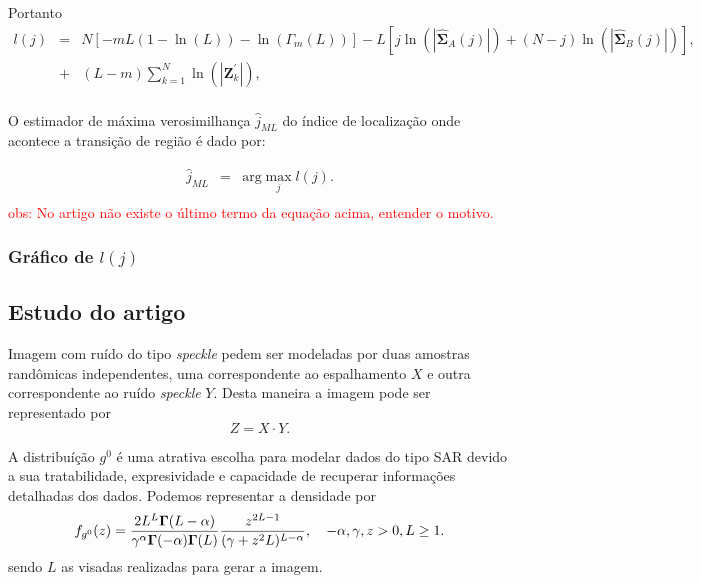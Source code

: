 Portanto 
\begin{equation}\label{eqn124}
\begin{array}{rcl}
	l(j)&=&N\left[-mL(1-\ln{\left(L\right)})-\ln{\left(\Gamma_m(L)\right)}\right]-L\left[j\ln{\left(|\mathbf{\widehat{\Sigma}}_{A}(j)|\right)} +(N-j)\ln{\left(|\mathbf{\widehat{\Sigma}}_{B}(j)|\right)}\right], \\
	&+&(L-m)\sum_{k=1}^{N}\ln{\left(|\mathbf{Z}_{k}^{'}|\right)}, \\
\end{array}
\end{equation}

O estimador de máxima verosimilhança $\widehat{j}_{ML}$ do índice de localização onde acontece a transição de região é dado por:


\begin{equation}\label{eqn125}
\begin{array}{rcl}
	\widehat{j}_{ML}&=&\text{arg}\max\limits_{j}l(j).  \\
\end{array}
\end{equation}
\textcolor{red}{obs: No artigo não existe o último termo da equação acima, entender o motivo. }
\subsubsection{Gráfico de $l(j)$}

\subsection{Estudo do artigo  \cite{gmbf}}

Imagem com ruído do tipo {\it speckle} pedem ser modeladas por duas amostras randômicas independentes, uma correspondente ao espalhamento $X$ e outra correspondente ao ruído {\it speckle} $Y$. Desta maneira a imagem pode ser representado por $$Z=X \cdot Y.$$

A distribuíção $g^{0}$ é uma atrativa escolha para modelar dados do tipo SAR devido a sua tratabilidade, expresividade e capacidade de recuperar informações detalhadas dos dados. Podemos representar a densidade por
\begin{equation}\label{eqn126}
	f_{g^{0}}(z)=\frac{2L^{L}\mathbf{\Gamma}(L-\alpha)}{\gamma^{\alpha}\mathbf{\Gamma}(-\alpha)\mathbf{\Gamma}(L)}\frac{z^{2L-1}}{(\gamma+z^2L)^{L-\alpha}}, \quad -\alpha,\gamma,z>0,L\geq 1. \\
\end{equation}
sendo $L$ as visadas realizadas para gerar a imagem.

